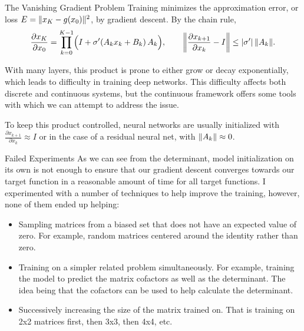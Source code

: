 \documentclass[aspectratio=169]{beamer}
\DeclarePairedDelimiter{\norm}{\lVert}{\rVert}
\begin{document}

\begin{frame}{The Vanishing Gradient Problem}
Training minimizes the approximation error, or loss $E = \norm{x_K - g(x_0)}^2$, by gradient descent. By the chain rule,
\[
\frac{\partial x_K}{\partial x_0} = \prod_{k=0}^{K-1}\Bigl(I + \sigma'(A_k x_k + B_k)\,A_k\Bigr), \qquad \norm*{\frac{\partial x_{k+1}}{\partial x_k} - I} \le |\sigma'|\,\norm{A_k}.
\]

\bigskip
With many layers, this product is prone to either grow or decay exponentially, which leads to difficulty in training deep networks. This difficulty affects both discrete and continuous systems, but the continuous framework offers some tools with which we can attempt to address the issue.

\bigskip
To keep this product controlled, neural networks are usually initialized with $\frac{\partial x_{k+1}}{\partial x_k} \approx I$ or in the case of a residual neural net, with $\norm{A_k} \approx 0$.
\end{frame}

\begin{frame}{Failed Experiments}
As we can see from the determinant, model initialization on its own is not enough to ensure that our gradient descent converges towards our target function in a reasonable amount of time for all target functions. I experimented with a number of techniques to help improve the training, however, none of them ended up helping:

\bigskip
\begin{itemize}
\item Sampling matrices from a biased set that does not have an expected value of zero. For example, random matrices centered around the identity rather than zero.
\item Training on a simpler related problem simultaneously. For example, training the model to predict the matrix cofactors as well as the determinant. The idea being that the cofactors can be used to help calculate the determinant.
\item Successively increasing the size of the matrix trained on. That is training on 2x2 matrices first, then 3x3, then 4x4, etc.
\end{itemize}
\end{frame}


\end{document}
